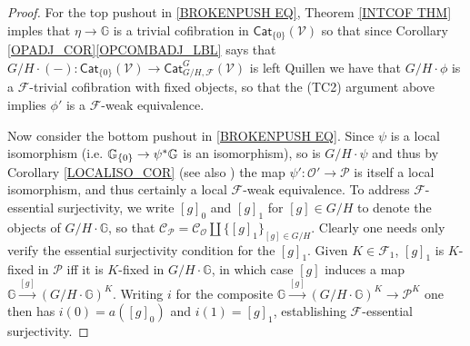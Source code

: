 \documentclass[a4paper,10pt
,draft
]{article}%
\numberwithin{equation}{section}
\numberwithin{figure}{section}
\theoremstyle{definition} %
\newcommand{\set}[1]{\left\{#1\right\}}%
\newcommand{\F}{\ensuremath{\mathcal F}}
\newcommand{\V}{\ensuremath{\mathcal V}}
\renewcommand{\O}{\ensuremath{\mathcal O}}
\renewcommand{\P}{\ensuremath{\mathcal P}}
\newcommand{\C}{\ensuremath{\mathcal C}}
\newcommand{\J}{\mathbb J}
\newcommand{\1}{\ensuremath{\mathbbm 1}}%
\begin{document}
\begin{proof}
For the top pushout in \eqref{BROKENPUSH EQ}, Theorem \ref{INTCOF THM} imples that $\eta \to \mathbb{G}$
is a trivial cofibration in $\mathsf{Cat}_{\{0\}}(\V)$
so that since Corollary \ref{OPADJ_COR}\ref{OPCOMBADJ_LBL} %
says that $G/H \cdot (-) \colon \mathsf{Cat}_{\{0\}}(\V) \to \mathsf{Cat}^G_{G/H,\F}(\V)$ is left Quillen
we have that $G/H \cdot \phi$ is a $\F$-trivial cofibration with fixed objects,
so that the (TC2) argument above implies $\phi'$ is a $\F$-weak equivalence.


Now consider the bottom pushout in \eqref{BROKENPUSH EQ}.
Since $\psi$ is a local isomorphism (i.e. $\mathbb{G}_{\{0\}} \to \psi^{\**}\mathbb{G}$ is an isomorphism),
so is $G/H \cdot \psi$ and thus by Corollary \ref{LOCALISO_COR} (see also \cite[Prop. B.22]{Cav})
the map $\psi' \colon \O' \to \mathcal{P}$
is itself a local isomorphism, and thus certainly a local $\F$-weak equivalence.
%
To address $\F$-essential surjectivity, 
we write $[g]_0$ and $[g]_1$ for $[g] \in G/H$
to denote the objects of $G/H \cdot \mathbb{G}$,
so that $\C_{\P} = \C_{\O} \amalg \{[g]_1\}_{[g] \in G/H}$.
Clearly one needs only verify the essential surjectivity condition for the $[g]_1$.
Given $K\in \F_1$,
$[g]_1$ is $K$-fixed in $\P$ iff it is $K$-fixed in $G/H \cdot \mathbb{G}$,
in which case $[g]$ induces a map
$\mathbb{G} \xrightarrow{[g]} \left(G/H \cdot \mathbb{G}\right)^K$.
Writing $i$ for the composite 
$\mathbb{G} \xrightarrow{[g]} \left(G/H \cdot \mathbb{G}\right)^K \to \P^K$
one then has $i(0) = a([g]_0)$ and $i(1)=[g]_1$,
establishing $\F$-essential surjectivity.


\end{proof}
\end{document}
